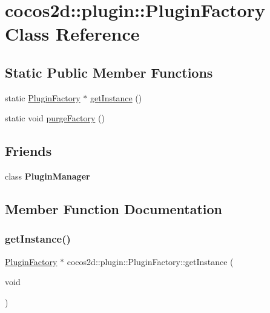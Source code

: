\hypertarget{classcocos2d_1_1plugin_1_1PluginFactory}{}\section{cocos2d\+:\+:plugin\+:\+:Plugin\+Factory Class Reference}
\label{classcocos2d_1_1plugin_1_1PluginFactory}
\subsection*{Static Public Member Functions}
\begin{DoxyCompactItemize}
\item 
static \hyperlink{classcocos2d_1_1plugin_1_1PluginFactory}{Plugin\+Factory} $\ast$ \hyperlink{classcocos2d_1_1plugin_1_1PluginFactory_ae617ef4f09368fee168186d9842efaaf}{get\+Instance} ()
\item 
static void \hyperlink{classcocos2d_1_1plugin_1_1PluginFactory_a29ce7b2d50cdc816688ff0b5df959641}{purge\+Factory} ()
\end{DoxyCompactItemize}
\subsection*{Friends}
\begin{DoxyCompactItemize}
\item 
\mbox{\label{classcocos2d_1_1plugin_1_1PluginFactory_ad0ccd35859b04e162412b22bf5200374}} 
class {\bfseries Plugin\+Manager}
\end{DoxyCompactItemize}


\subsection{Member Function Documentation}
\mbox{\label{classcocos2d_1_1plugin_1_1PluginFactory_ae617ef4f09368fee168186d9842efaaf}} 
\subsubsection{\texorpdfstring{get\+Instance()}{getInstance()}}
{\footnotesize\ttfamily \hyperlink{classcocos2d_1_1plugin_1_1PluginFactory}{Plugin\+Factory} $\ast$ cocos2d\+::plugin\+::\+Plugin\+Factory\+::get\+Instance (\begin{DoxyParamCaption}\item[{void}]{ }\end{DoxyParamCaption})\hspace{0.3cm}{\ttfamily [static]}}

